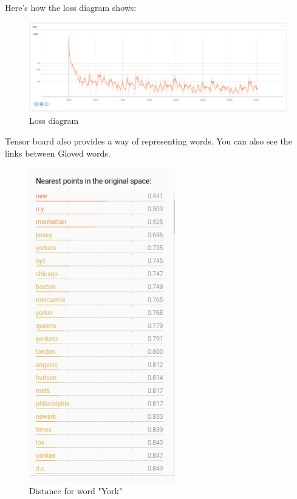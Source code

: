 Here's how the loss diagram shows:

\begin{figure}[H]
  \centering
  \includegraphics[width=6.5in]{images/loss.png}
  \caption {Loss diagram}
\end{figure}

Tensor board also provides a way of representing words. You can also see the links between Gloved words.

\begin{figure}[H]
  \centering
  \includegraphics[width=2.5in]{images/york.png}
  \caption {Distance for word "York"}
\end{figure}
